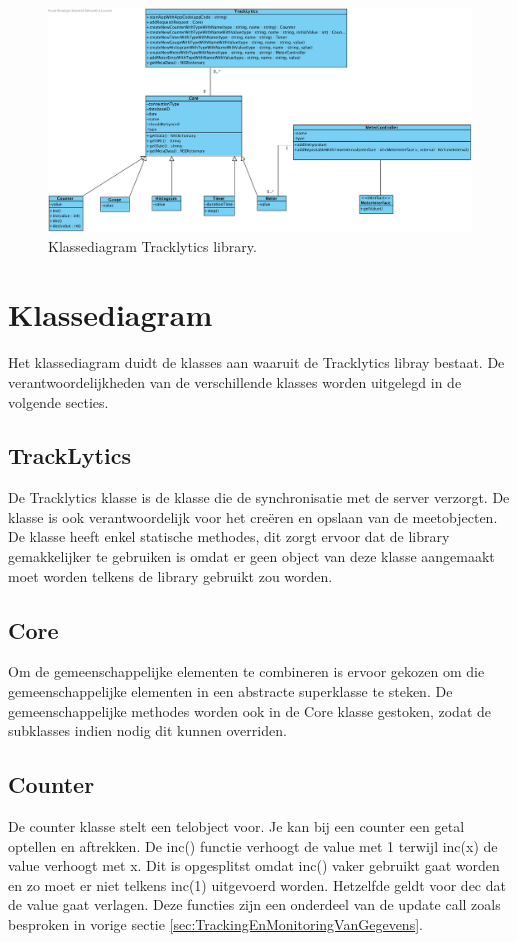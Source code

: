 \begin{figure}[!h]
  \centering
  \includegraphics[scale=0.4]{Afbeeldingen/Architectuur/ClassDiagram}
  \caption{Klassediagram Tracklytics library.}
  \label{fig:fig}
\end{figure}

\section{Klassediagram} \label{sec:Klassediagram}
Het klassediagram duidt de klasses aan waaruit de Tracklytics libray bestaat. De verantwoordelijkheden van de verschillende klasses worden uitgelegd in de volgende secties.

\subsection{TrackLytics}
De Tracklytics klasse is de klasse die de synchronisatie met de server verzorgt. De klasse is ook verantwoordelijk voor het creëren en opslaan van de meetobjecten. De klasse heeft enkel statische methodes, dit zorgt ervoor dat de library gemakkelijker te gebruiken is omdat er geen object van deze klasse aangemaakt moet worden telkens de library gebruikt zou worden.

\subsection{Core}
Om de gemeenschappelijke elementen te combineren is ervoor gekozen om die gemeenschappelijke elementen in een abstracte superklasse te steken. De gemeenschappelijke methodes worden ook in de Core klasse gestoken, zodat de subklasses indien nodig dit kunnen overriden. 

\subsection{Counter}
De counter klasse stelt een telobject voor. Je kan bij een counter een getal optellen en aftrekken. De inc() functie verhoogt de value met 1 terwijl inc(x) de value verhoogt met x. Dit is opgesplitst omdat inc() vaker gebruikt gaat worden en zo moet er niet telkens inc(1) uitgevoerd worden. Hetzelfde geldt voor dec dat de value gaat verlagen. Deze functies zijn een onderdeel van de update call zoals besproken in vorige sectie \ref{sec:TrackingEnMonitoringVanGegevens}.

